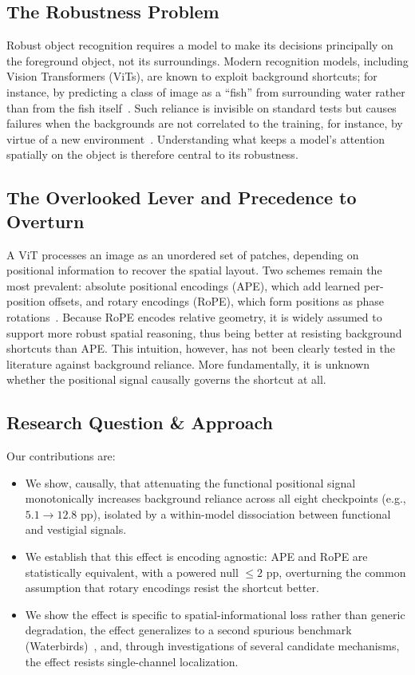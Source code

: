 \documentclass[10pt,twocolumn,letterpaper]{article}
\begin{document}
\subsection{The Robustness Problem}
Robust object recognition requires a model to make its decisions principally on the foreground object, not its surroundings. Modern recognition models, including Vision Transformers (ViTs), are known to exploit background shortcuts; for instance, by predicting a class of image as a ``fish'' from surrounding water rather than from the fish itself~\cite{xiao2021,geirhos2020}. Such reliance is invisible on standard tests but causes failures when the backgrounds are not correlated to the training, for instance, by virtue of a new environment~\cite{sagawa2020}. Understanding what keeps a model's attention spatially on the object is therefore central to its robustness.

\subsection{The Overlooked Lever and Precedence to Overturn}
A ViT processes an image as an unordered set of patches, depending on positional information to recover the spatial layout. Two schemes remain the most prevalent: absolute positional encodings (APE), which add learned per-position offsets, and rotary encodings (RoPE), which form positions as phase rotations~\cite{heo2024}. Because RoPE encodes relative geometry, it is widely assumed to support more robust spatial reasoning, thus being better at resisting background shortcuts than APE. This intuition, however, has not been clearly tested in the literature against background reliance. More fundamentally, it is unknown whether the positional signal causally governs the shortcut at all.

\subsection{Research Question \& Approach}
Our contributions are:
\begin{itemize}
    \item We show, causally, that attenuating the functional positional signal monotonically increases background reliance across all eight checkpoints (e.g., $5.1 \rightarrow 12.8$ pp), isolated by a within-model dissociation between functional and vestigial signals.
    \item We establish that this effect is encoding agnostic: APE and RoPE are statistically equivalent, with a powered null $\le 2$ pp, overturning the common assumption that rotary encodings resist the shortcut better.
    \item We show the effect is specific to spatial-informational loss rather than generic degradation, the effect generalizes to a second spurious benchmark (Waterbirds)~\cite{sagawa2020}, and, through investigations of several candidate mechanisms, the effect resists single-channel localization.
\end{itemize}
\end{document}
